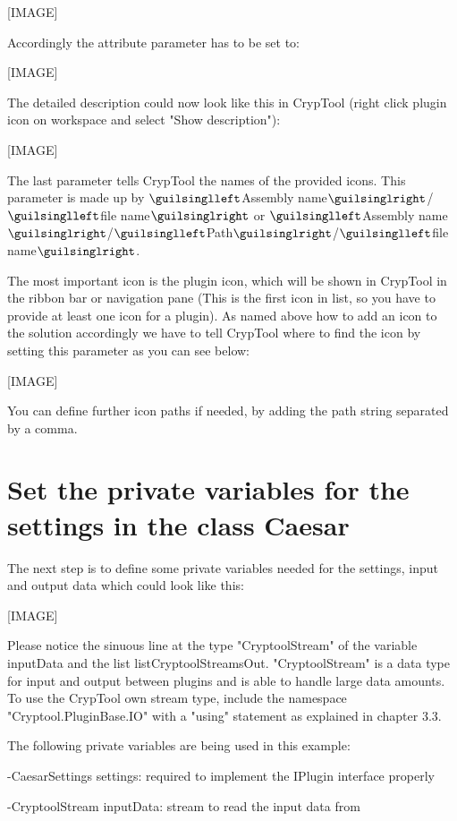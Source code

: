 [IMAGE]

Accordingly the attribute parameter has to be set to:

[IMAGE]

The detailed description could now look like this in CrypTool (right click plugin icon on workspace and select "Show description"):

[IMAGE]

The last parameter tells CrypTool the names of the provided icons. This parameter is made up by $\guilsinglleft$Assembly name$\guilsinglright$/$\guilsinglleft$file name$\guilsinglright$ or $\guilsinglleft$Assembly name$\guilsinglright$/$\guilsinglleft$Path$\guilsinglright$/$\guilsinglleft$file name$\guilsinglright$.

The most important icon is the plugin icon, which will be shown in CrypTool in the ribbon bar or navigation pane (This is the first icon in list, so you have to provide at least one icon for a plugin). As named above how to add an icon to the solution accordingly we have to tell CrypTool where to find the icon by setting this parameter as you can see below:

[IMAGE]

You can define further icon paths if needed, by adding the path string separated by a comma.
\section{Set the private variables for the settings in the class Caesar}
\label{sec:SetThePrivateVariablesForTheSettingsInTheClassMD5}
The next step is to define some private variables needed for the settings, input and output data which could look like this:

[IMAGE]

Please notice the sinuous line at the type "CryptoolStream" of the variable inputData and the list listCryptoolStreamsOut. "CryptoolStream" is a data type for input and output between plugins and is able to handle large data amounts. To use the CrypTool own stream type, include the namespace "Cryptool.PluginBase.IO" with a "using" statement as explained in chapter 3.3.

The following private variables are being used in this example:

\hspace{20pt}-CaesarSettings settings: required to implement the IPlugin interface properly

\hspace{20pt}-CryptoolStream inputData: stream to read the input data from

